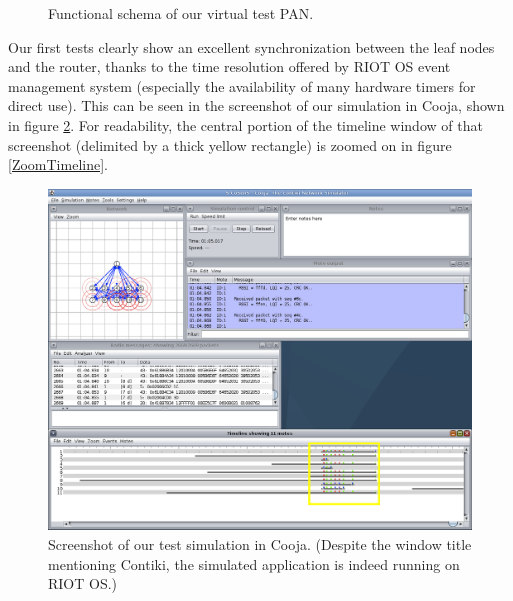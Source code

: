 \documentclass[a4paper,twoside]{article}
\begin{document}
\begin{figure}[!h]
\centering
{}
\caption{Functional schema of our virtual test PAN.}
\label{FigPANtest}
\end{figure}

Our first tests clearly show an excellent synchronization between the
leaf nodes and the router, thanks to the time resolution offered by RIOT OS
event management system (especially the availability of many hardware
timers for direct use). This can be seen in the screenshot of our
simulation in Cooja, shown in figure \ref{Screenshot}. For readability,
the central portion of the timeline window of that screenshot (delimited
by a thick yellow rectangle) is zoomed on in figure \ref{ZoomTimeline}.

\begin{figure}[ptb]
\centering
\includegraphics[width=15.75cm]{S-CoSenS-Cooja10.png}
\caption{Screenshot of our test simulation in Cooja. 
(Despite the window title mentioning Contiki, the simulated application
 is indeed running on RIOT OS.)}
\label{Screenshot}
\end{figure}
\end{document}

